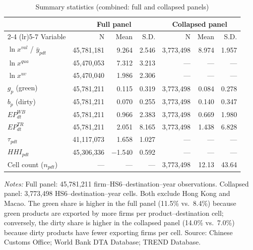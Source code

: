 \documentclass[12pt]{article}
\begin{document}
\begin{table}[htbp]
\centering
\caption{Summary statistics (combined: full and collapsed panels)}
\label{tab:sumstats_combined}
\small
\begin{threeparttable}
\begin{tabular}{lrrrrrr}
\toprule
 & \multicolumn{3}{c}{Full panel} & \multicolumn{3}{c}{Collapsed panel} \\
\cmidrule(lr){2-4} \cmidrule(lr){5-7}
Variable & N & Mean & S.D. & N & Mean & S.D. \\
\midrule
$\ln x^{val}$ / $\bar{y}_{pdt}$ & 45{,}781{,}181 & 9.264 & 2.546 & 3{,}773{,}498 & 8.974 & 1.957 \\
$\ln x^{qua}$ & 45{,}470{,}053 & 7.312 & 3.213 & --- & --- & --- \\
$\ln x^{uv}$ & 45{,}470{,}040 & 1.986 & 2.306 & --- & --- & --- \\
$g_p$ (green) & 45{,}781{,}211 & 0.115 & 0.319 & 3{,}773{,}498 & 0.084 & 0.278 \\
$b_p$ (dirty) & 45{,}781{,}211 & 0.070 & 0.255 & 3{,}773{,}498 & 0.140 & 0.347 \\
$EP^{WB}_{dt}$ & 45{,}781{,}211 & 0.966 & 2.383 & 3{,}773{,}498 & 0.669 & 1.980 \\
$EP^{TR}_{dt}$ & 45{,}781{,}211 & 2.051 & 8.165 & 3{,}773{,}498 & 1.438 & 6.828 \\
$\tau_{pdt}$ & 41{,}117{,}073 & 1.658 & 1.027 & --- & --- & --- \\
$HHI_{pdt}$ & 45{,}306{,}336 & $-$1.540 & 0.592 & --- & --- & --- \\
Cell count ($n_{pdt}$) & --- & --- & --- & 3{,}773{,}498 & 12.13 & 43.64 \\
\bottomrule
\end{tabular}
\begin{tablenotes}\footnotesize
\item \emph{Notes:} Full panel: 45{,}781{,}211 firm--HS6--destination--year observations. Collapsed
panel: 3{,}773{,}498 HS6--destination--year cells. Both exclude Hong Kong and Macao.
The green share is higher in the full panel (11.5\% vs.\ 8.4\%) because green products
are exported by more firms per product--destination cell; conversely, the dirty share
is higher in the collapsed panel (14.0\% vs.\ 7.0\%) because dirty products have fewer
exporting firms per cell. Source: Chinese Customs Office; World Bank DTA Database; TREND Database.
\end{tablenotes}
\end{threeparttable}
\end{table}
\end{document}
